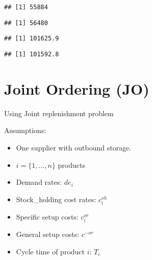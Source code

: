\documentclass[
]{article}
\newenvironment{Shaded}{\begin{snugshade}}{\end{snugshade}}
\newcommand{\CommentTok}[1]{\textcolor[rgb]{0.56,0.35,0.01}{\textit{#1}}}
\newcommand{\KeywordTok}[1]{\textcolor[rgb]{0.13,0.29,0.53}{\textbf{#1}}}
\newcommand{\NormalTok}[1]{#1}
\newcommand{\OperatorTok}[1]{\textcolor[rgb]{0.81,0.36,0.00}{\textbf{#1}}}
\providecommand{\tightlist}{%
  \setlength{\itemsep}{0pt}\setlength{\parskip}{0pt}}
\begin{document}
\begin{verbatim}
## [1] 55884
\end{verbatim}

\begin{Shaded}
\end{Shaded}

\begin{verbatim}
## [1] 56480
\end{verbatim}

\begin{Shaded}
\end{Shaded}

\begin{verbatim}
## [1] 101625.9
\end{verbatim}

\begin{Shaded}
\end{Shaded}

\begin{verbatim}
## [1] 101592.8
\end{verbatim}

\hypertarget{joint-ordering-jo}{%
\section{Joint Ordering (JO)}\label{joint-ordering-jo}}

Using Joint replenishment problem

Assumptions:

\begin{itemize}
\tightlist
\item
  One supplier with outbound storage.
\item
  \(i=\{1,...,n\}\) products
\item
  Demand rates: \(de_i\)
\item
  Stock\_holding cost rates: \(c_i^{sh}\)
\item
  Specific setup costs: \(c_i^{or}\)
\item
  General setup costs: \(c^{-or}\)
\item
  Cycle time of product \(i\): \(T_i\)
\end{itemize}
\end{document}
